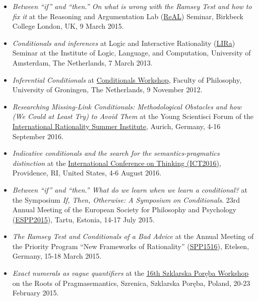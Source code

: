 \documentclass[a4paper,12pt]{article}
\begin{document}
\begin{small}
\begin{itemize}
    \item \emph{Between ``if'' and ``then.'' On what is wrong with the Ramsey Test and how to fix it} at the Reasoning and Argumentation Lab (\href{http://www.bbk.ac.uk/psychology/ral}{ReAL}) Seminar, Birkbeck College London, UK, 9 March 2015.

    \item \emph{Conditionals and inferences} at Logic and Interactive
    Rationality (\href{http://www.illc.uva.nl/lgc/seminar/}{LIRa})
    Seminar at the Institute of Logic, Language, and Computation,
    University of Amsterdam, The Netherlands, 7 March 2013.
  
    \item \emph{Inferential Conditionals} at
    \href{https://sites.google.com/site/jannekehuitink/workshop}{Conditionals Workshop}, Faculty of Philosophy, University of Groningen, The Netherlands, 9 November 2012.
  \end{itemize}
  
  \begin{itemize}
  	\item \emph{Researching Missing-Link Conditionals: Methodological Obstacles and how (We Could at Least Try) to Avoid Them} at the Young Scientisci Forum of the \href{https://irsi2016.de}{International Rationality Summer Institute}, Aurich, Germany, 4-16 September 2016. 

    \item \emph{Indicative conditionals and the search for the semantics-pragmatics distinction} at the \href{http://sites.clps.brown.edu/ict2016/}{International Conference on Thinking (ICT2016)}, Providence, RI, United States, 4-6 August 2016. 

    \item \emph{Between ``if'' and ``then.'' What do we learn when we learn a conditional?} at the Symposium \emph{If, Then, Otherwise: A Symposium on Conditionals}. 23rd Annual Meeting of the European Society for Philosophy and Psychology (\href{http://espp2015.ut.ee}{ESPP2015}), Tartu, Estonia, 14-17 July 2015.

    \item \emph{The Ramsey Test and Conditionals of a Bad Advice} at the Annual Meeting of the Priority Program ``New Frameworks of Rationality'' (\href{http://www.spp1516.de}{SPP1516}), Etelsen, Germany, 15-18 March 2015.

    \item \emph{Exact numerals as vague quantifiers} at the \href{https://sites.google.com/site/szklarskaporebaworkshop16/}{16th Szklarska Poręba Workshop} on the Roots of Pragmasemantics, Szrenica, Szklarska Poręba, Poland, 20-23 February 2015.


\end{itemize}
\end{small}
\end{document}
